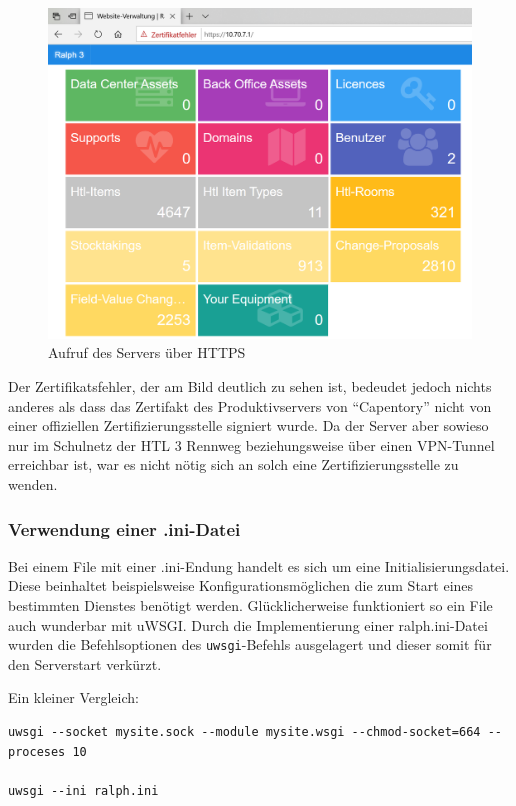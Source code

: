 \begin{figure}[ht]
\centering
\includegraphics{https.png}
\caption{Aufruf des Servers über HTTPS}
\end{figure}

Der Zertifikatsfehler, der am Bild deutlich zu sehen ist, bedeudet
jedoch nichts anderes als dass das Zertifakt des Produktivservers von
``Capentory'' nicht von einer offiziellen Zertifizierungsstelle signiert
wurde. Da der Server aber sowieso nur im Schulnetz der HTL 3 Rennweg
beziehungsweise über einen VPN-Tunnel erreichbar ist, war es nicht nötig
sich an solch eine Zertifizierungsstelle zu wenden.

\hypertarget{verwendung-einer-.ini-datei}{%
\subsubsection{Verwendung einer
.ini-Datei}\label{verwendung-einer-.ini-datei}}

Bei einem File mit einer .ini-Endung handelt es sich um eine
Initialisierungsdatei. Diese beinhaltet beispielsweise
Konfigurationsmöglichen die zum Start eines bestimmten Dienstes benötigt
werden. Glücklicherweise funktioniert so ein File auch wunderbar mit
uWSGI. Durch die Implementierung einer ralph.ini-Datei wurden die
Befehlsoptionen des \texttt{uwsgi}-Befehls ausgelagert und dieser somit
für den Serverstart verkürzt.

Ein kleiner Vergleich:

\begin{verbatim}
uwsgi --socket mysite.sock --module mysite.wsgi --chmod-socket=664 --proceses 10

uwsgi --ini ralph.ini
\end{verbatim}

